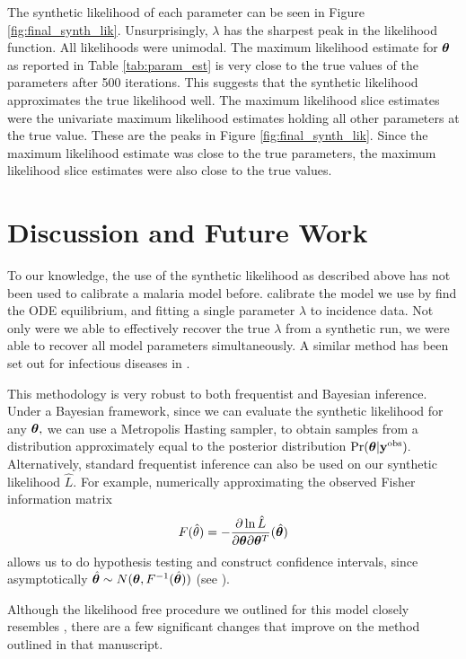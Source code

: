 The synthetic likelihood of each parameter can be seen in Figure
\ref{fig:final_synth_lik}. Unsurprisingly, $\lambda$ has the sharpest peak
in the likelihood function. All likelihoods were unimodal.
The maximum likelihood estimate for $\bm{\theta}$ as reported in Table
\ref{tab:param_est} is very close to the true values of the parameters after
500 iterations. This suggests that the synthetic likelihood approximates the
true likelihood well. The maximum likelihood slice estimates were the
univariate maximum likelihood
estimates holding all other parameters at the true value. These are the peaks
in Figure \ref{fig:final_synth_lik}.
Since the maximum likelihood estimate was close to the true parameters,
the maximum likelihood slice estimates were also close to the true values.

\section{Discussion and Future Work}

To our knowledge, the use of the synthetic likelihood as described above
has not been used to calibrate a malaria model before.
 calibrate the model we use
by find the ODE equilibrium, and fitting a single parameter $\lambda$ to
incidence data. Not only were we able to effectively
recover the true $\lambda$ from a synthetic run, we were able to recover
all model parameters simultaneously.
A similar method has
been set out for infectious diseases in \cite{gutmann_bayesian_2016}.

This methodology is very robust to both frequentist and Bayesian inference.
Under a Bayesian framework,
since we can evaluate the synthetic likelihood for any $\bm{\theta},$
we can use a Metropolis Hasting sampler, to obtain samples from a distribution
approximately equal to the posterior distribution $\Pr(\bm{\theta} | \mathbf{y}^{\mathrm{obs}}).$
Alternatively, standard frequentist inference can also be used on our
synthetic likelihood $\hat{L}.$ For example, numerically approximating the
observed Fisher information matrix
$$
    F(\hat{\theta})
    = -\frac{\partial \ln\hat{L}}{\partial \bm{\theta}\partial \bm{\theta}^T}(\hat{\bm{\theta}})
$$
allows us to do hypothesis testing and construct confidence intervals,
since asymptotically $\hat{\bm{\theta}} \sim N(\bm{\theta}, F^{-1}(\hat{\bm{\theta}}))$
(see \cite{fahrmeir_multivariate_2013}).

Although the likelihood free procedure we outlined for this model closely
resembles \cite{gutmann_bayesian_2016}, there are a few significant changes
that improve on the method outlined in that manuscript.

